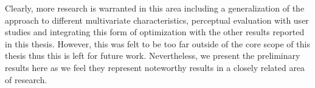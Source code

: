 Clearly, more research is warranted in this area including a generalization of the approach to different multivariate characteristics, perceptual evaluation with user studies and integrating this form of optimization with the other results reported in this thesis. However, this was felt to be too far outside of the core scope of this thesis thus this is left for future work. Nevertheless, we present the preliminary results here as we feel they represent noteworthy results in a closely related area of research.

